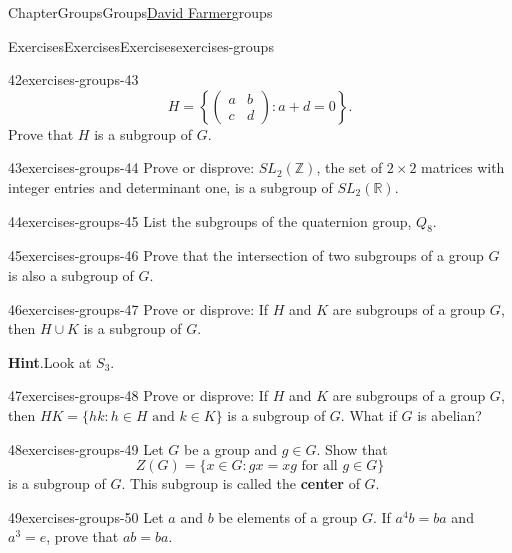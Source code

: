 \documentclass[oneside,10pt,]{book}
\newcommand{\blocktitlefont}{\relax}
\newcommand{\terminology}[1]{\textbf{#1}}
\numberwithin{equation}{section}
\begin{document}
\begin{chapterptx}{Chapter}{Groups}{}{Groups}{\hyperlink{dfarmer}{David Farmer}}{}{groups}
\begin{exercises-section}{Exercises}{Exercises}{}{Exercises}{}{}{exercises-groups}
\begin{divisionexercise}{42}{}{}{exercises-groups-43}
\begin{equation*}
H =
\left\{
\begin{pmatrix}
a & b \\
c & d
\end{pmatrix} :
a + d = 0
\right\}.
\end{equation*}
Prove that \(H\) is a subgroup of \(G\).%
\end{divisionexercise}%
\begin{divisionexercise}{43}{}{}{exercises-groups-44}%
Prove or disprove: \(SL_2( {\mathbb Z} )\), the set of \(2 \times 2\) matrices with integer entries and determinant one, is a subgroup of \(SL_2( {\mathbb R} )\).%
\end{divisionexercise}%
\begin{divisionexercise}{44}{}{}{exercises-groups-45}%
List the subgroups of the quaternion group, \(Q_8\).%
\end{divisionexercise}%
\begin{divisionexercise}{45}{}{}{exercises-groups-46}%
Prove that the intersection of two subgroups of a group \(G\) is also a subgroup of \(G\).%
\end{divisionexercise}%
\begin{divisionexercise}{46}{}{}{exercises-groups-47}%
Prove or disprove:  If \(H\) and \(K\) are subgroups of a group \(G\), then \(H \cup K\) is a subgroup of \(G\).%
\par\smallskip%
\noindent\textbf{\blocktitlefont Hint}.\hypertarget{exercises-groups-47-2}{}\quad{}Look at \(S_3\).%
\end{divisionexercise}%
\begin{divisionexercise}{47}{}{}{exercises-groups-48}%
Prove or disprove: If \(H\) and \(K\) are subgroups of a group \(G\), then \(H K = \{hk : h \in H \text{ and } k \in K \}\) is a subgroup of \(G\). What if \(G\) is abelian?%
\end{divisionexercise}%
\begin{divisionexercise}{48}{}{}{exercises-groups-49}%
Let \(G\) be a group and \(g \in G\). Show that%
\begin{equation*}
Z(G) = \{ x \in G : gx = xg \text{ for all } g \in G \}
\end{equation*}
is a subgroup of \(G\). This subgroup is called the \terminology{center} of \(G\). \label{exercises-groups-49-1-1-7}%
\end{divisionexercise}%
\begin{divisionexercise}{49}{}{}{exercises-groups-50}%
Let \(a\) and \(b\) be elements of a group \(G\). If \(a^4b = ba\) and \(a^3 = e\), prove that \(ab = ba\).%

\end{divisionexercise}
\end{exercises-section}
\end{chapterptx}
\end{document}
